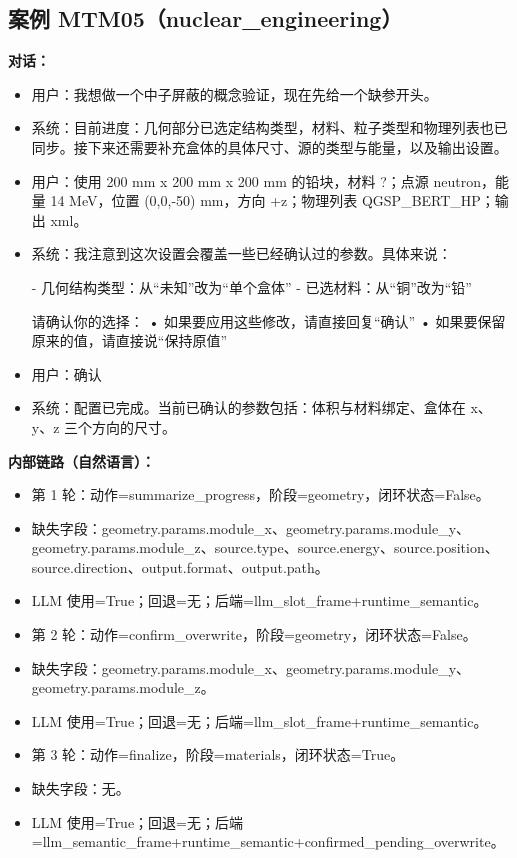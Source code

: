 \documentclass[11pt]{ctexart}
\begin{document}
\subsection{案例 MTM05（nuclear\_engineering）}
\textbf{对话：}
\begin{itemize}
\item 用户：我想做一个中子屏蔽的概念验证，现在先给一个缺参开头。
\item 系统：目前进度：几何部分已选定结构类型，材料、粒子类型和物理列表也已同步。接下来还需要补充盒体的具体尺寸、源的类型与能量，以及输出设置。
\item 用户：使用 200 mm x 200 mm x 200 mm 的铅块，材料 ?；点源 neutron，能量 14 MeV，位置 (0,0,-50) mm，方向 +z；物理列表 QGSP\_BERT\_HP；输出 xml。
\item 系统：我注意到这次设置会覆盖一些已经确认过的参数。具体来说：

- 几何结构类型：从“未知”改为“单个盒体”
- 已选材料：从“铜”改为“铅”

请确认你的选择：
• 如果要应用这些修改，请直接回复“确认”
• 如果要保留原来的值，请直接说“保持原值”
\item 用户：确认
\item 系统：配置已完成。当前已确认的参数包括：体积与材料绑定、盒体在 x、y、z 三个方向的尺寸。
\end{itemize}
\textbf{内部链路（自然语言）：}
\begin{itemize}
\item 第 1 轮：动作=summarize\_progress，阶段=geometry，闭环状态=False。
\item 缺失字段：geometry.params.module\_x、geometry.params.module\_y、geometry.params.module\_z、source.type、source.energy、source.position、source.direction、output.format、output.path。
\item LLM 使用=True；回退=无；后端=llm\_slot\_frame+runtime\_semantic。
\item 第 2 轮：动作=confirm\_overwrite，阶段=geometry，闭环状态=False。
\item 缺失字段：geometry.params.module\_x、geometry.params.module\_y、geometry.params.module\_z。
\item LLM 使用=True；回退=无；后端=llm\_slot\_frame+runtime\_semantic。
\item 第 3 轮：动作=finalize，阶段=materials，闭环状态=True。
\item 缺失字段：无。
\item LLM 使用=True；回退=无；后端=llm\_semantic\_frame+runtime\_semantic+confirmed\_pending\_overwrite。
\end{itemize}
\end{document}
